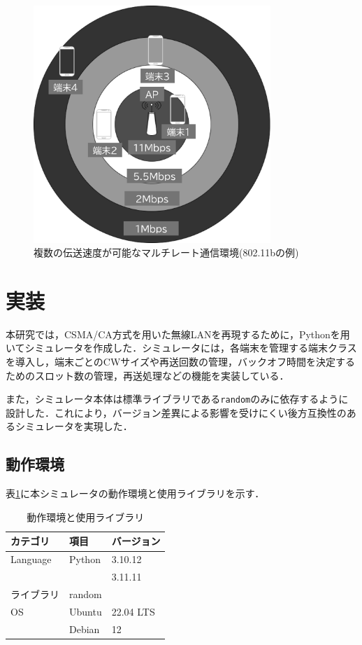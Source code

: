 \documentclass[a4paper,10pt]{ltjsarticle}
\begin{document}
\begin{figure}
  \centering
  \includegraphics[width=0.8\textwidth]{./assets/multilate.png}
  \caption{複数の伝送速度が可能なマルチレート通信環境(802.11bの例)}
  \label{multirate}
\end{figure}

\clearpage
\section{実装}

本研究では，CSMA/CA方式を用いた無線LANを再現するために，Pythonを用いてシミュレータを作成した．シミュレータには，各端末を管理する端末クラスを導入し，端末ごとのCWサイズや再送回数の管理，バックオフ時間を決定するためのスロット数の管理，再送処理などの機能を実装している．

また，シミュレータ本体は標準ライブラリである\texttt{random}のみに依存するように設計した．これにより，バージョン差異による影響を受けにくい後方互換性のあるシミュレータを実現した．


\subsection{動作環境}

表\ref{tab:env}に本シミュレータの動作環境と使用ライブラリを示す．



\begin{table}[h]
  \centering
  \caption{動作環境と使用ライブラリ}
  \label{tab:env}
  \begin{tabular}{l|l|l}
      \hline
      カテゴリ & 項目 & バージョン \\ \hline
      Language           & Python        & 3.10.12 \\ 
      &               & 3.11.11 \\ \hline
      ライブラリ       & random         & \\ \hline
      OS               & Ubuntu        & 22.04 LTS \\ 
                       & Debian        & 12 \\ \hline
  \end{tabular}
\end{table}
\end{document}

